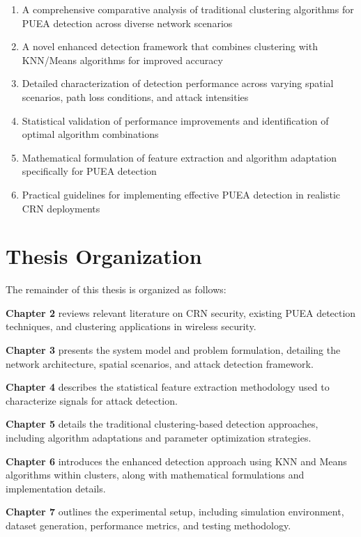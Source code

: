 \begin{enumerate}
    \item A comprehensive comparative analysis of traditional clustering algorithms for PUEA detection across diverse network scenarios
    \item A novel enhanced detection framework that combines clustering with KNN/Means algorithms for improved accuracy
    \item Detailed characterization of detection performance across varying spatial scenarios, path loss conditions, and attack intensities
    \item Statistical validation of performance improvements and identification of optimal algorithm combinations
    \item Mathematical formulation of feature extraction and algorithm adaptation specifically for PUEA detection
    \item Practical guidelines for implementing effective PUEA detection in realistic CRN deployments
\end{enumerate}

\section{Thesis Organization}

The remainder of this thesis is organized as follows:

\textbf{Chapter 2} reviews relevant literature on CRN security, existing PUEA detection techniques, and clustering applications in wireless security.

\textbf{Chapter 3} presents the system model and problem formulation, detailing the network architecture, spatial scenarios, and attack detection framework.

\textbf{Chapter 4} describes the statistical feature extraction methodology used to characterize signals for attack detection.

\textbf{Chapter 5} details the traditional clustering-based detection approaches, including algorithm adaptations and parameter optimization strategies.

\textbf{Chapter 6} introduces the enhanced detection approach using KNN and Means algorithms within clusters, along with mathematical formulations and implementation details.

\textbf{Chapter 7} outlines the experimental setup, including simulation environment, dataset generation, performance metrics, and testing methodology.

